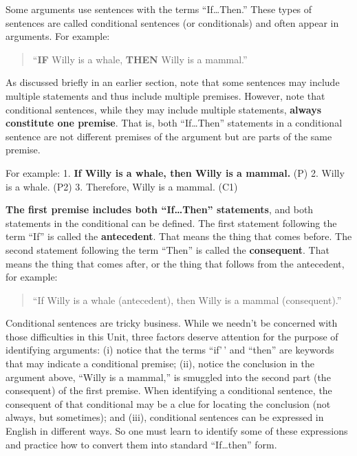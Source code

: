 \documentclass[
]{book}
\begin{document}
\begin{reflect}
Some arguments use sentences with the terms ``If\ldots Then.'' These types of sentences are called conditional sentences (or conditionals) and often appear in arguments. For example:

\begin{quote}
``\textbf{IF} Willy is a whale, \textbf{THEN} Willy is a mammal.''
\end{quote}

As discussed briefly in an earlier section, note that some sentences may include multiple statements and thus include multiple premises. However, note that conditional sentences, while they may include multiple statements, \textbf{always constitute one premise}. That is, both ``If\ldots Then'' statements in a conditional sentence are not different premises of the argument but are parts of the same premise.

For example:
1. \textbf{If Willy is a whale, then Willy is a mammal.} (P)
2. Willy is a whale. (P2)
3. Therefore, Willy is a mammal. (C1)

\textbf{The first premise includes both ``If\ldots Then'' statements}, and both statements in the conditional can be defined. The first statement following the term ``If'' is called the \textbf{antecedent}. That means the thing that comes before. The second statement following the term ``Then'' is called the \textbf{consequent}. That means the thing that comes after, or the thing that follows from the antecedent, for example:

\begin{quote}
``If Willy is a whale (antecedent), then Willy is a mammal (consequent).''
\end{quote}

Conditional sentences are tricky business. While we needn't be concerned with those difficulties in this Unit, three factors deserve attention for the purpose of identifying arguments: (i) notice that the terms ``if'\,' and ``then'' are keywords that may indicate a conditional premise; (ii), notice the conclusion in the argument above, ``Willy is a mammal,'' is smuggled into the second part (the consequent) of the first premise. When identifying a conditional sentence, the consequent of that conditional may be a clue for locating the conclusion (not always, but sometimes); and (iii), conditional sentences can be expressed in English in different ways. So one must learn to identify some of these expressions and practice how to convert them into standard ``If\ldots then'' form.


\end{reflect}
\end{document}
